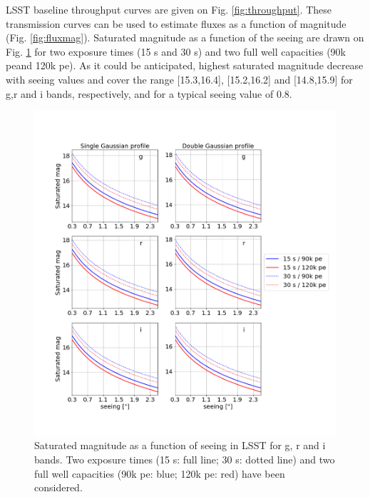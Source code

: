 \documentclass[\docopts]{\docclass}
\newcommand{\pe}{{pe}}
\begin{document}
LSST baseline throughput curves  are given on Fig. \ref{fig:throughput}. These transmission curves can be used to estimate fluxes as a function of magnitude (Fig. \ref{fig:fluxmag}). Saturated magnitude as a function of the seeing are drawn on Fig. \ref{fig:magsat} for two exposure times (15 s and 30 s) and two full well capacities (90k \pe and 120k \pe). As it could be anticipated, highest saturated magnitude decrease with seeing values and cover the range [15.3,16.4], [15.2,16.2] and [14.8,15.9] for g,r and i bands, respectively, and for a typical seeing value of 0.8\arcsec. 
\begin{figure}[htbp]
 \includegraphics[width=1.1\textwidth]{magsat.png}
 \caption{Saturated magnitude as a function of seeing in LSST for g, r and i bands. Two exposure times (15 s: full line; 30 s: dotted line) and two full well capacities (90k \pe: blue; 120k \pe: red) have been considered.}\label{fig:magsat}
\end{figure}
\end{document}
